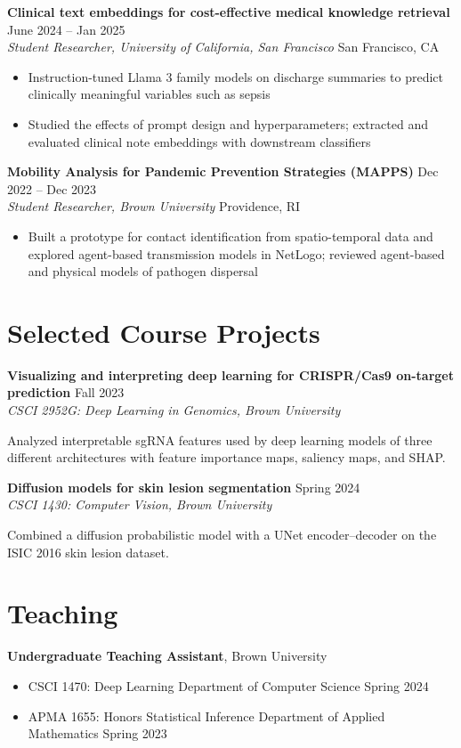 \documentclass[10pt,letterpaper]{article}
\newcommand{\entry}[4]{%
  \textbf{#1} \hfill #2\\
  \textit{#3} \hfill #4\par\vspace{2pt}}
\begin{document}
\entry{Clinical text embeddings for cost-effective medical knowledge retrieval}{June 2024 -- Jan 2025}{Student Researcher, University of California, San Francisco}{San Francisco, CA}
\begin{itemize}
  \item Instruction-tuned Llama 3 family models on discharge summaries to predict clinically meaningful variables such as sepsis
  \item Studied the effects of prompt design and hyperparameters; extracted and evaluated clinical note embeddings with
        downstream classifiers
\end{itemize}
\vspace{4pt}

\entry{Mobility Analysis for Pandemic Prevention Strategies (MAPPS)}{Dec 2022 -- Dec 2023}{Student Researcher, Brown University}{Providence, RI}
\begin{itemize}
  \item Built a prototype for contact identification from spatio-temporal data and explored agent-based transmission
        models in NetLogo; reviewed agent-based and physical models of pathogen dispersal
\end{itemize}

\section{Selected Course Projects}
\entry{Visualizing and interpreting deep learning for CRISPR/Cas9 on-target prediction}{Fall 2023}{CSCI 2952G: Deep Learning in Genomics, Brown University}{}
Analyzed interpretable sgRNA features used by deep learning models of three different architectures with feature importance maps, saliency maps, and SHAP.
\vspace{6pt}

\entry{Diffusion models for skin lesion segmentation}{Spring 2024}{CSCI 1430: Computer Vision, Brown University}{}
Combined a diffusion probabilistic model with a UNet encoder--decoder on the ISIC 2016 skin lesion dataset.

\section{Teaching}
\textbf{Undergraduate Teaching Assistant}, Brown University\par\vspace{2pt}
\begin{itemize}
  \item CSCI 1470: Deep Learning \textbar{} Department of Computer Science \hfill Spring 2024
  \item APMA 1655: Honors Statistical Inference \textbar{} Department of Applied Mathematics \hfill Spring 2023
\end{itemize}
\end{document}
